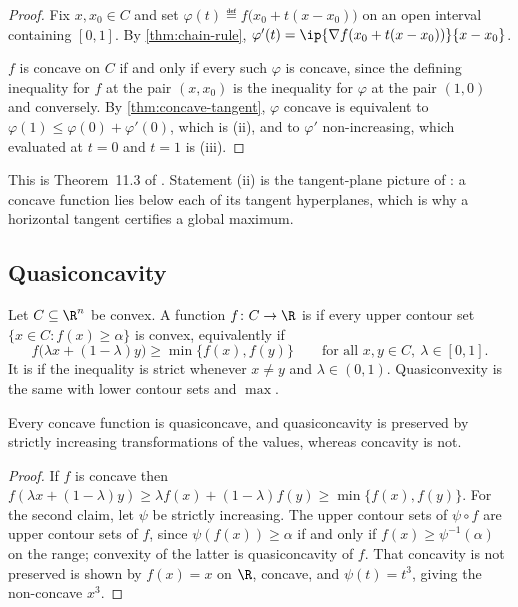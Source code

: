 \begin{proof}
	Fix $x,x_0\in C$ and set $\varphi(t)\eqdef f\bigl(x_0+t(x-x_0)\bigr)$ on an
	open interval containing $[0,1]$. By \autoref{thm:chain-rule},
	$\varphi'(t)=\ip{\nabla f(x_0+t(x-x_0))}{x-x_0}$.

	$f$ is concave on $C$ if and only if every such $\varphi$ is concave, since the
	defining inequality for $f$ at the pair $(x,x_0)$ is the inequality for
	$\varphi$ at the pair $(1,0)$ and conversely. By
	\autoref{thm:concave-tangent}, $\varphi$ concave is equivalent to
	$\varphi(1)\leq\varphi(0)+\varphi'(0)$, which is (ii), and to $\varphi'$
	non-increasing, which evaluated at $t=0$ and $t=1$ is (iii).
\end{proof}

This is Theorem~11.3 of \textcite[p.~388]{fukuda2026notes}. Statement (ii) is
the tangent-plane picture of \autocite[slides 8, 52]{fukuda2026calculus}: a
concave function lies below each of its tangent hyperplanes, which is why a
horizontal tangent certifies a global maximum.

\subsection{Quasiconcavity}

\begin{definition}[Quasiconcavity]\label{def:quasiconcave}
	Let $C\subseteq\R^n$ be convex. A function $f\colon C\to\R$ is
	 if every upper contour set
	$\{x\in C : f(x)\geq\alpha\}$ is convex, equivalently if
	\[
		f\bigl(\lambda x+(1-\lambda)y\bigr)\geq\min\{f(x),f(y)\}
		\qquad\text{for all }x,y\in C,\ \lambda\in[0,1] .
	\]
	It is  if the inequality is strict whenever
	$x\neq y$ and $\lambda\in(0,1)$. Quasiconvexity is the same with lower contour
	sets and $\max$.
\end{definition}

\begin{proposition}\label{prop:concave-implies-quasiconcave}
	Every concave function is quasiconcave, and quasiconcavity is preserved by
	strictly increasing transformations of the values, whereas concavity is not.
\end{proposition}

\begin{proof}
	If $f$ is concave then
	$f(\lambda x+(1-\lambda)y)\geq\lambda f(x)+(1-\lambda)f(y)
		\geq\min\{f(x),f(y)\}$. For the second claim, let $\psi$ be strictly
	increasing. The upper contour sets of $\psi\circ f$ are upper contour sets of
	$f$, since $\psi(f(x))\geq\alpha$ if and only if
	$f(x)\geq\psi^{-1}(\alpha)$ on the range; convexity of the latter is
	quasiconcavity of $f$. That concavity is not preserved is shown by
	$f(x)=x$ on $\R$, concave, and $\psi(t)=t^3$, giving the non-concave $x^3$.
\end{proof}

